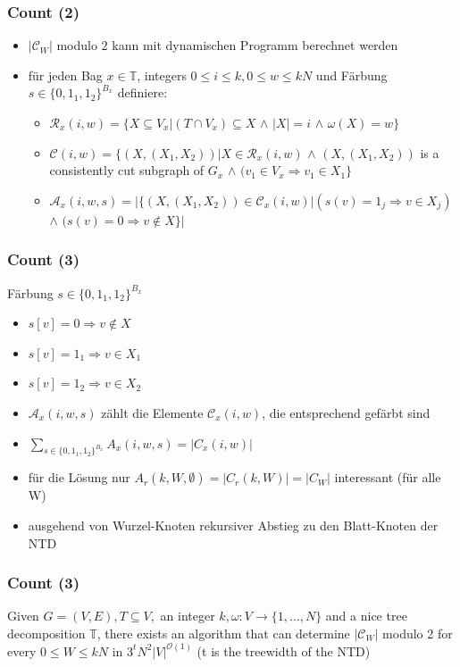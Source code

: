 \documentclass{beamer}
\begin{document}
\begin{frame}
\frametitle{Count (2)}
\begin{itemize}
\item $|\mathcal{C}_W|$ modulo $2$ kann mit dynamischen Programm berechnet werden
\item für jeden Bag $x \in \mathbb{T}$, integers $0 \leq i \leq k,0 \leq w \leq kN$ und Färbung $s \in \{0,1_1,1_2 \}^{B_x}$ definiere:
\begin{itemize}
\item $\mathcal{R}_x(i,w)=\{X \subseteq V_x | (T \cap V_x) \subseteq X$ $\wedge$ $|X| = i$ $\wedge$ $\omega (X) = w \}$
\item $\mathcal{C} (i,w) =\{ (X,(X_1,X_2)) | X \in \mathcal{R}_x(i,w)$ $\wedge$ $(X,(X_1,X_2))$ is a consistently cut subgraph of $G_x$ $\wedge$ $(v_1 \in V_x \Rightarrow v_1 \in X_1 \} $
\item $\mathcal{A}_x(i,w,s)=| \{ (X,(X_1,X_2)) \in \mathcal{C}_x(i,w) | (s(v) = 1_j \Rightarrow v \in X_j)$ $\wedge$ $(s(v)=0 \Rightarrow v \notin X \} |$

\end{itemize}
\end{itemize}
\end{frame}
\begin{frame}
\frametitle{Count (3)}
Färbung $s \in \{0,1_1,1_2 \}^{B_x}$
\begin{itemize}
\item $s[v] = 0 \Rightarrow v \notin X$
\item $s[v] = 1_1 \Rightarrow v \in X_1$ 
\item $s[v] = 1_2 \Rightarrow v \in X_2$ 
\item $\mathcal{A}_x(i,w,s)$ zählt die Elemente $\mathcal{C}_x(i,w)$, die entsprechend gefärbt sind
\item $\sum\limits_{s \in  \{ 0,1_1,1_2 \}^{B_x} } A_x(i,w,s) = |C_x(i,w)|$
\item für die Lösung nur $A_r(k,W,\emptyset) = |C_r(k,W)| = |C_W|$ interessant (für alle W)
\item ausgehend von Wurzel-Knoten rekursiver Abstieg zu den Blatt-Knoten der NTD
\end{itemize}
\end{frame}
\begin{frame}
\frametitle{Count (3)}
\begin{theorem}[Lemma 3.5]
Given $G=(V,E), T \subseteq V,$ an integer $k, \omega:V\rightarrow \{1,\dots,N \}$ and a nice tree decomposition $\mathbb{T}$, there exists an algorithm that can determine $|\mathcal{C}_W|$ modulo 2 for every $0 \leq W \leq kN$ in $3^tN^2|V|^{\mathcal{O}(1)}$ (t is the treewidth of the NTD)
\end{theorem}
\end{frame}
\end{document}
